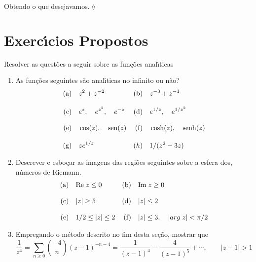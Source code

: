 Obtendo o que desejavamos.\hfill \(\lozenge\)

\section*{Exerc\'{\i}cios Propostos}
Resolver as quest\~{o}es a seguir sobre as fun\c{c}\~{o}es anal\'{\i}ticas
\begin{enumerate}[label=(\arabic*)]
\item As fun\c{c}\~{o}es seguintes s\~{a}o anal\'{\i}ticas no infinito ou n\~{a}o?
\begin{align*}
\rm{(a)}&\quad z^2 + z^{-2}   &\rm{(b)}&\quad  z^{-3}+z^{-1}\\[2ex]
\rm{(c)}&\quad e^z,\quad e^{z^2},\quad e^{-z} &\rm{(d)}& \quad e^{1/z},\quad e^{1/z^2}\\[2ex]
\rm{(e)}&\quad \cos(z),\quad \operatorname{sen}(z)  &\rm{(f)}&\quad \cosh(z),\quad\operatorname{senh}(z)\\[2ex]
\rm{(g)}&\quad ze^{1/z} &(h)&\quad 1/(z^2-3z)
\end{align*}

\item Descrever e esbo\c{c}ar as imagens das regi\~{o}es seguintes sobre a
esfera dos, n\'{u}meros de Riemann.
\begin{align*}
\rm{(a)}&\quad \textrm{Re}\; z\le 0  &\rm{(b)}&\quad \textrm{Im}\; z\geq 0\\[2ex]
\rm{(c)}&\quad  |z|\geq 5 &\rm{(d)}&\quad |z|\le 2\\[2ex]
\rm{(e)}&\quad 1/2\le |z|\le 2  &\rm{(f)}&\quad |z|\le 3,\quad |arg\; z|<\pi/2
\end{align*}

\item Empregando o m\'{e}todo descrito no fim desta se\c{c}\~{a}o, mostrar que
\begin{equation*}
\frac{1}{z^4}=\sum_{n\geq 0}{-4\choose n}(z-1)^{-n-4} =
\frac{1}{(z-1)^4}-\frac{4}{(z-1)^5}+\cdots,\qquad |z-1|>1
\end{equation*}
\end{enumerate}
